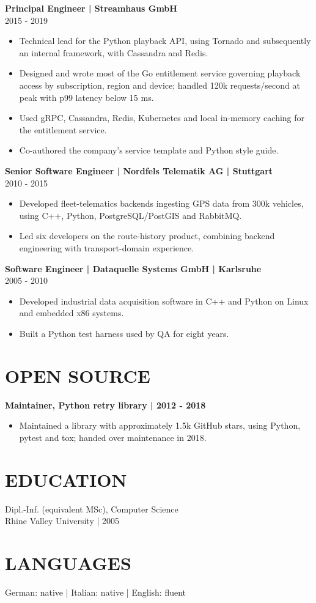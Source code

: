 \documentclass[11pt,a4paper]{article}
\newcommand{\cvsection}[1]{\Needspace{4\baselineskip}\section*{#1}}
\newcommand{\cvrole}[2]{\Needspace{6\baselineskip}\noindent\textbf{#1}\\#2\par}
\begin{document}
\cvrole{Principal Engineer | Streamhaus GmbH}{2015 - 2019}
\begin{itemize}
\item Technical lead for the Python playback API, using Tornado and subsequently an internal framework, with Cassandra and Redis.
\item Designed and wrote most of the Go entitlement service governing playback access by subscription, region and device; handled 120k requests/second at peak with p99 latency below 15 ms.
\item Used gRPC, Cassandra, Redis, Kubernetes and local in-memory caching for the entitlement service.
\item Co-authored the company's service template and Python style guide.
\end{itemize}

\cvrole{Senior Software Engineer | Nordfels Telematik AG | Stuttgart}{2010 - 2015}
\begin{itemize}
\item Developed fleet-telematics backends ingesting GPS data from 300k vehicles, using C++, Python, PostgreSQL/PostGIS and RabbitMQ.
\item Led six developers on the route-history product, combining backend engineering with transport-domain experience.
\end{itemize}

\cvrole{Software Engineer | Dataquelle Systems GmbH | Karlsruhe}{2005 - 2010}
\begin{itemize}
\item Developed industrial data acquisition software in C++ and Python on Linux and embedded x86 systems.
\item Built a Python test harness used by QA for eight years.
\end{itemize}

\cvsection{OPEN SOURCE}
\textbf{Maintainer, Python retry library | 2012 - 2018}
\begin{itemize}
\item Maintained a library with approximately 1.5k GitHub stars, using Python, pytest and tox; handed over maintenance in 2018.
\end{itemize}

\cvsection{EDUCATION}
Dipl.-Inf. (equivalent MSc), Computer Science\\
Rhine Valley University | 2005

\cvsection{LANGUAGES}
German: native | Italian: native | English: fluent
\end{document}
